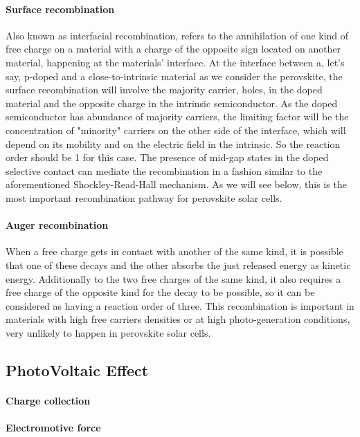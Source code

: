 		\paragraph{Surface recombination}\label{intro_surface_recombination}
		Also known as interfacial recombination, refers to the annihilation of one kind of free charge on a material with a charge of the opposite sign located on another material, happening at the materials' interface.
		At the interface between a, let's say, p-doped and a close-to-intrinsic material as we consider the perovskite, the surface recombination will involve the majority carrier, holes, in the doped material and the opposite charge in the intrinsic semiconductor.
		As the doped semiconductor has abundance of majority carriers, the limiting factor will be the concentration of "minority" carriers on the other side of the interface, which will depend on its mobility and on the electric field in the intrinsic.
		So the reaction order should be 1 for this case.
		The presence of mid-gap states in the doped selective contact can mediate the recombination in a fashion similar to the aforementioned Shockley-Read-Hall mechanism.
		As we will see below, this is the most important recombination pathway for perovskite solar cells.

		\paragraph{Auger recombination}
		When a free charge gets in contact with another of the same kind, it is possible that one of these decays and the other absorbs the just released energy as kinetic energy.
		Additionally to the two free charges of the same kind, it also requires a free charge of the opposite kind for the decay to be possible, so it can be considered as having a reaction order of three.
		This recombination is important in materials with high free carriers densities or at high photo-generation conditions, very unlikely to happen in perovskite solar cells.

	\subsection{PhotoVoltaic Effect}

		\paragraph{Charge collection}

		\paragraph{Electromotive force}

